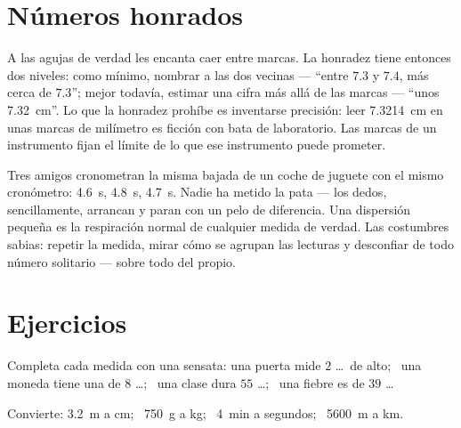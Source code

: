 \section{Números honrados}

\begin{remark}\label{rem:g6:measurement-in-science:between}
A las agujas de verdad les encanta caer entre marcas. La honradez
tiene entonces dos niveles: como mínimo, nombrar a las dos vecinas ---
``entre $7.3$ y $7.4$, más cerca de $7.3$''; mejor todavía, estimar
una cifra más allá de las marcas --- ``unos \qty{7.32}{cm}''. Lo que
la honradez prohíbe es inventarse precisión: leer \qty{7.3214}{cm} en
unas marcas de milímetro es ficción con bata de laboratorio. Las
marcas de un instrumento fijan el límite de lo que ese instrumento
puede prometer.
\end{remark}

\begin{example}\label{ex:g6:measurement-in-science:repeat}
Tres amigos cronometran la misma bajada de un coche de juguete con el
mismo cronómetro: \qty{4.6}{s}, \qty{4.8}{s}, \qty{4.7}{s}. Nadie ha
metido la pata --- los dedos, sencillamente, arrancan y paran con un
pelo de diferencia. Una dispersión pequeña es la respiración normal de
cualquier medida de verdad. Las costumbres sabias: repetir la medida,
mirar cómo se agrupan las lecturas y desconfiar de todo número
solitario --- sobre todo del propio.
\end{example}

\section{Ejercicios}

\begin{exercise}[$\star$]\label{exo:g6:measurement-in-science:1}
Completa cada medida con una  sensata: una puerta mide $2$
\dots\ de alto; \ una moneda tiene una  de $8$ \dots; \ una clase
dura $55$ \dots; \ una fiebre es de $39$ \dots
\end{exercise}

\begin{exercise}[$\star$]\label{exo:g6:measurement-in-science:2}
Convierte: \qty{3.2}{m} a \unit{cm}; \ \qty{750}{g} a \unit{kg}; \
\qty{4}{min} a segundos; \ \qty{5600}{m} a \unit{km}.
\end{exercise}

